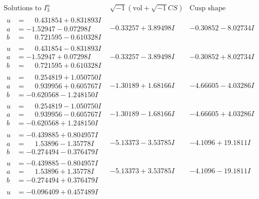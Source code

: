\documentclass[1p]{elsarticle_modified}
\theoremstyle{definition}
\newcommand{\I}{\sqrt{-1}}
\begin{document}
$$\begin{array}{c|c|c}  
\text{Solutions to }I^u_{3}& \I (\text{vol} + \sqrt{-1}CS) & \text{Cusp shape}\\
 \hline 
\begin{aligned}
u &= \phantom{-}0.431854 + 0.831893 I \\
a &= -1.52947 - 0.07298 I \\
b &= \phantom{-}0.721595 - 0.610328 I\end{aligned}
 & -0.33257 + 3.89498 I & -0.30852 - 8.02734 I \\ \hline\begin{aligned}
u &= \phantom{-}0.431854 - 0.831893 I \\
a &= -1.52947 + 0.07298 I \\
b &= \phantom{-}0.721595 + 0.610328 I\end{aligned}
 & -0.33257 - 3.89498 I & -0.30852 + 8.02734 I \\ \hline\begin{aligned}
u &= \phantom{-}0.254819 + 1.050750 I \\
a &= \phantom{-}0.939956 + 0.605767 I \\
b &= -0.620568 - 1.248150 I\end{aligned}
 & -1.30189 + 1.68166 I & -4.66605 - 4.03286 I \\ \hline\begin{aligned}
u &= \phantom{-}0.254819 - 1.050750 I \\
a &= \phantom{-}0.939956 - 0.605767 I \\
b &= -0.620568 + 1.248150 I\end{aligned}
 & -1.30189 - 1.68166 I & -4.66605 + 4.03286 I \\ \hline\begin{aligned}
u &= -0.439885 + 0.804957 I \\
a &= \phantom{-}1.53896 - 1.35778 I \\
b &= -0.274494 - 0.376479 I\end{aligned}
 & -5.13373 - 3.53785 I & -4.1096 + 19.1811 I \\ \hline\begin{aligned}
u &= -0.439885 - 0.804957 I \\
a &= \phantom{-}1.53896 + 1.35778 I \\
b &= -0.274494 + 0.376479 I\end{aligned}
 & -5.13373 + 3.53785 I & -4.1096 - 19.1811 I \\ \hline\begin{aligned}
u &= -0.096409 + 0.457489 I \\

\end{aligned}
\end{array}$$
\end{document}
